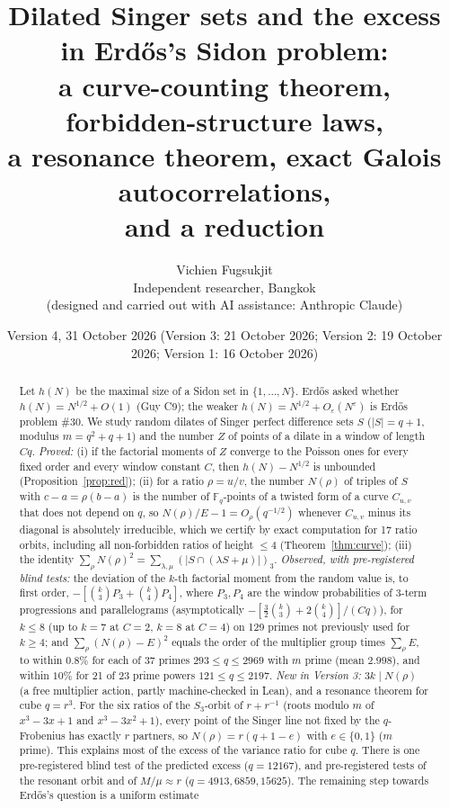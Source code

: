 \documentclass[11pt]{article}
\title{Dilated Singer sets and the excess in Erd\H{o}s's Sidon problem:\\ a curve-counting theorem, forbidden-structure laws,\\ a resonance theorem, exact Galois autocorrelations,\\ and a reduction}
\author{Vichien Fugsukjit\\ Independent researcher, Bangkok\\ \small(designed and carried out with AI assistance: Anthropic Claude)}
\date{Version 4, 31 October 2026 (Version 3: 21 October 2026; Version 2: 19 October 2026; Version 1: 16 October 2026)}
\begin{document}
\maketitle
\begin{abstract}
Let $h(N)$ be the maximal size of a Sidon set in $\{1,\dots,N\}$. Erd\H{o}s asked whether $h(N)=N^{1/2}+O(1)$ (Guy C9); the weaker
$h(N)=N^{1/2}+O_\varepsilon(N^\varepsilon)$ is Erd\H{o}s problem \#30. We study random dilates of Singer perfect difference sets $S$
($|S|=q+1$, modulus $m=q^2+q+1$) and the number $Z$ of points of a dilate in a window of length $Cq$.
\emph{Proved:} (i) if the factorial moments of $Z$ converge to the Poisson ones for every fixed order and every window constant $C$, then $h(N)-N^{1/2}$ is unbounded
(Proposition~\ref{prop:red}); (ii) for a ratio $\rho=u/v$, the number $N(\rho)$ of triples of $S$ with $c-a=\rho(b-a)$ is the number
of $\mathbb F_q$-points of a twisted form of a curve $C_{u,v}$ that does not depend on $q$, so $N(\rho)/E-1=O_\rho(q^{-1/2})$ whenever
$C_{u,v}$ minus its diagonal is absolutely irreducible, which we certify by exact computation for 17 ratio orbits, including all
non-forbidden ratios of height $\le4$ (Theorem~\ref{thm:curve}); (iii) the identity $\sum_\rho N(\rho)^2=\sum_{\lambda,\mu}(|S\cap(\lambda S+\mu)|)_3$.
\emph{Observed, with pre-registered blind tests:} the deviation of the $k$-th factorial moment from the random value is, to first order,
$-[\binom k3P_3+\binom k4P_4]$, where $P_3,P_4$ are the window probabilities of 3-term progressions and parallelograms (asymptotically
$-[\tfrac32\binom k3+2\binom k4]/(Cq)$), for $k\le8$ (up to $k=7$ at $C=2$, $k=8$ at $C=4$) on 129 primes not previously used for $k\ge4$; and $\sum_\rho(N(\rho)-E)^2$ equals the order of the multiplier
group times $\sum_\rho E$, to within $0.8\%$ for each of 37 primes $293\le q\le2969$ with $m$ prime (mean $2.998$),
and within $10\%$ for 21 of 23 prime powers $121\le q\le2197$. \emph{New in Version 3:} $3k\mid N(\rho)$ (a free multiplier action, partly machine-checked in Lean), and a resonance theorem for cube $q=r^3$. For the six ratios of the $S_3$-orbit of $r+r^{-1}$ (roots modulo $m$ of $x^3-3x+1$ and $x^3-3x^2+1$), every point of the Singer line not fixed by the $q$-Frobenius has exactly $r$ partners, so $N(\rho)=r(q+1-e)$ with $e\in\{0,1\}$ ($m$ prime). This explains most of the excess of the variance ratio for cube $q$. There is one pre-registered blind test of the predicted excess ($q=12167$), and pre-registered tests of the resonant orbit and of $M/\mu\approx r$ ($q=4913,6859,15625$). The remaining step towards Erd\H{o}s's question is a uniform estimate

\end{abstract}
\end{document}
